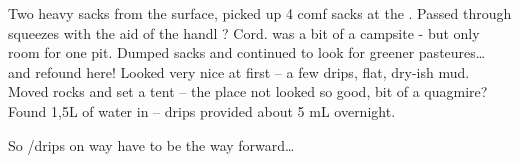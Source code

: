 Two heavy sacks from the surface, picked up 4 comf sacks at the
. Passed through squeezes with the aid of the handl
? Cord.  was a bit of a campsite - but only room for one
pit. Dumped sacks and continued to look for greener pasteures\ldots{} and
refound here! Looked very nice at first -- a few drips, flat, dry-ish
mud. Moved rocks and set a tent -- the place not looked so good, bit of
a quagmire? Found 1,5L of water in  -- drips
provided about 5 mL overnight.

So /drips on  way have to be the way
forward\ldots{}



\newpage


\begin{pagefigure}
	\checkoddpage \ifoddpage \forcerectofloat \else \forceversofloat \fi
	\centering
	

\end{pagefigure}
